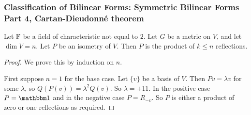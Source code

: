     \subsubsection{Classification of Bilinear Forms: Symmetric Bilinear Forms Part 4, Cartan-Dieudonn\'e theorem}
    \begin{thm}
    Let $\operatorname{\mathbb{F}}$ be a field of characteristic not equal to $2$. Let $G$ be a metric on $V$, and let $\dim V = n$. Let $P$ be an isometry of $V$. Then $P$ is the product of $k\leq n$ reflections.\end{thm}
    \begin{proof}
        We prove this by induction on $n$.
        
        First suppose $n=1$ for the base case.
        Let $\{v\}$ be a basis of $V$. Then $Pv =\lambda v$ for some $\lambda$, so $Q(P(v))=\lambda^2 Q(v)$. So $\lambda = \pm 11$. In the positive case $P=\One$ and in the negative case $P = R_{-v}$. So $P$ is either a product of zero or one reflections as required.


\end{proof}
